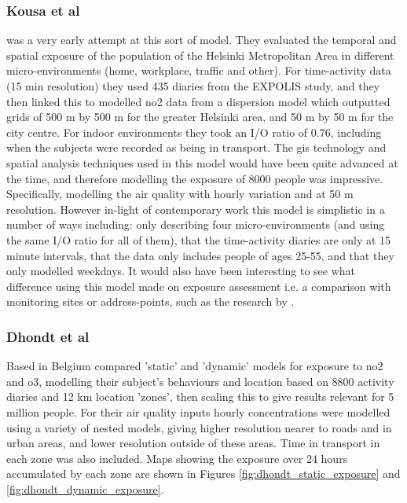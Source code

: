 
\subsubsection{Kousa et al}
\label{sec:dynamic_models_kousa}

\cite{Kousa2002} was a very early attempt at this sort of model. They evaluated the temporal and spatial exposure of the population of the Helsinki Metropolitan Area in different micro-environments (home, workplace, traffic and other). For time-activity data (15 min resolution) they used 435 diaries from the EXPOLIS study, and they then linked this to modelled \gls{no2} data from a dispersion model which outputted grids of 500 m by 500 m for the greater Helsinki area, and 50 m by 50 m for the city centre. For indoor environments they took an I/O ratio of 0.76, including when the subjects were recorded as being in transport. The \gls{gis} technology and spatial analysis techniques used in this model would have been quite advanced at the time, and therefore modelling the exposure of 8000 people was impressive. Specifically, modelling the air quality with hourly variation and at 50 m resolution. However in-light of contemporary work this model is simplistic in a number of ways including: only describing four micro-environments (and using the same I\slash O ratio for all of them), that the time-activity diaries are only at 15 minute intervals, that the data only includes people of ages 25-55, and that they only modelled weekdays. It would also have been interesting to see what difference using this model made on exposure assessment i.e. a comparison with monitoring sites or address-points, such as the research by \cite{Dhondt2012}.

\subsubsection{Dhondt et al}
\label{sec:dynamic_models_dhondt}

Based in Belgium \cite{Dhondt2012} compared 'static' and 'dynamic' models for exposure to \gls{no2} and \gls{o3}, modelling their subject's behaviours and location based on 8800 activity diaries and 12 km location 'zones', then scaling this to give results relevant for 5 million people. For their air quality inputs hourly concentrations were modelled using a variety of nested models, giving higher resolution nearer to roads and in urban areas, and lower resolution outside of these areas. Time in transport in each zone was also included. Maps showing the exposure over 24 hours accumulated by each zone are shown in Figures \ref{fig:dhondt_static_exposure} and \ref{fig:dhondt_dynamic_exposure}.

